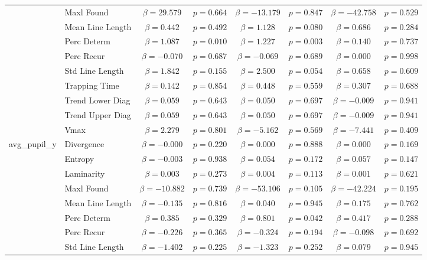 \begin{tabular}{llcc|cc|cc}
 & Maxl Found & $\beta = 29.579$ & $p = 0.664$ & $\beta = -13.179$ & $p = 0.847$ & $\beta = -42.758$ & $p = 0.529$ \\
 & Mean Line Length & $\beta = 0.442$ & $p = 0.492$ & $\beta = 1.128$ & $p = 0.080$ & $\beta = 0.686$ & $p = 0.284$ \\
 & Perc Determ & $\beta = 1.087$ & $p = 0.010$ & $\beta = 1.227$ & $p = 0.003$ & $\beta = 0.140$ & $p = 0.737$ \\
 & Perc Recur & $\beta = -0.070$ & $p = 0.687$ & $\beta = -0.069$ & $p = 0.689$ & $\beta = 0.000$ & $p = 0.998$ \\
 & Std Line Length & $\beta = 1.842$ & $p = 0.155$ & $\beta = 2.500$ & $p = 0.054$ & $\beta = 0.658$ & $p = 0.609$ \\
 & Trapping Time & $\beta = 0.142$ & $p = 0.854$ & $\beta = 0.448$ & $p = 0.559$ & $\beta = 0.307$ & $p = 0.688$ \\
 & Trend Lower Diag & $\beta = 0.059$ & $p = 0.643$ & $\beta = 0.050$ & $p = 0.697$ & $\beta = -0.009$ & $p = 0.941$ \\
 & Trend Upper Diag & $\beta = 0.059$ & $p = 0.643$ & $\beta = 0.050$ & $p = 0.697$ & $\beta = -0.009$ & $p = 0.941$ \\
 & Vmax & $\beta = 2.279$ & $p = 0.801$ & $\beta = -5.162$ & $p = 0.569$ & $\beta = -7.441$ & $p = 0.409$ \\
\midrule
\multirow{12}{*}{avg_pupil_y} & Divergence & $\beta = -0.000$ & $p = 0.220$ & $\beta = 0.000$ & $p = 0.888$ & $\beta = 0.000$ & $p = 0.169$ \\
 & Entropy & $\beta = -0.003$ & $p = 0.938$ & $\beta = 0.054$ & $p = 0.172$ & $\beta = 0.057$ & $p = 0.147$ \\
 & Laminarity & $\beta = 0.003$ & $p = 0.273$ & $\beta = 0.004$ & $p = 0.113$ & $\beta = 0.001$ & $p = 0.621$ \\
 & Maxl Found & $\beta = -10.882$ & $p = 0.739$ & $\beta = -53.106$ & $p = 0.105$ & $\beta = -42.224$ & $p = 0.195$ \\
 & Mean Line Length & $\beta = -0.135$ & $p = 0.816$ & $\beta = 0.040$ & $p = 0.945$ & $\beta = 0.175$ & $p = 0.762$ \\
 & Perc Determ & $\beta = 0.385$ & $p = 0.329$ & $\beta = 0.801$ & $p = 0.042$ & $\beta = 0.417$ & $p = 0.288$ \\
 & Perc Recur & $\beta = -0.226$ & $p = 0.365$ & $\beta = -0.324$ & $p = 0.194$ & $\beta = -0.098$ & $p = 0.692$ \\
 & Std Line Length & $\beta = -1.402$ & $p = 0.225$ & $\beta = -1.323$ & $p = 0.252$ & $\beta = 0.079$ & $p = 0.945$ \\

\end{tabular}

